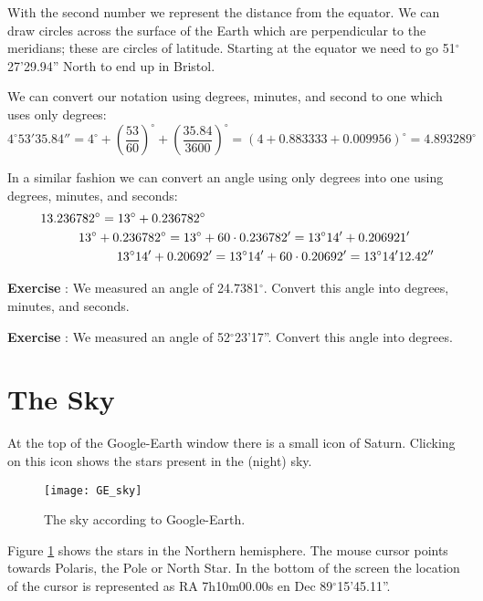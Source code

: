 With the second number we represent the distance from the equator. We can draw circles across the surface of the Earth which are perpendicular to the meridians; these are circles of latitude. Starting at the equator we need to go 51$^{\circ}$27'29.94'' North to end up in Bristol.

We can convert our notation using degrees, minutes, and second to one which uses only degrees:
\begin{equation*}
4^{\circ}53'35.84'' = 4^{\circ} + \left( \frac{53}{60} \right)^{\circ} + \left( \frac{35.84}{3600} \right)^{\circ} = (4 + 0.883333 + 0.009956)^{\circ} = 4.893289^{\circ}
\end{equation*}

In a similar fashion we can convert an angle using only degrees into one using degrees, minutes, and seconds:
\begin{align*}
& 13.236782^{\circ} = 13^{\circ} + 0.236782^{\circ} \\
& \indent \indent 13^{\circ} + 0.236782^{\circ} = 13^{\circ} + 60 \cdot 0.236782' = 13^{\circ}14' + 0.206921' \\
& \indent \indent \indent \indent 13^{\circ}14' + 0.20692' = 13^{\circ}14' + 60 \cdot 0.20692' = 13^{\circ}14'12.42''
\end{align*}

\begin{shaded}
\textbf{Exercise \theExercise {}} : We measured an angle of 24.7381$^{\circ}$. Convert this angle into degrees, minutes, and seconds.\end{shaded}
\begin{shaded}
\textbf{Exercise \theExercise {}} : We measured an angle of 52$^{\circ}$23'17''. Convert this angle into degrees.\end{shaded}

\section{The Sky}
At the top of the Google-Earth window there is a small icon of Saturn. Clicking on this icon shows the stars present in the (night) sky.
\begin{figure}\begin{center}
\texttt{[image: GE\_sky]}
\caption{The sky according to Google-Earth.}\label{fig:GE_sky}
\end{center}\end{figure}

Figure \ref{fig:GE_sky} shows the stars in the Northern hemisphere. The mouse cursor points towards Polaris, the Pole or North Star. In the bottom of the screen the location of the cursor is represented as RA 7h10m00.00s en Dec 89$^{\circ}$15'45.11''. 

